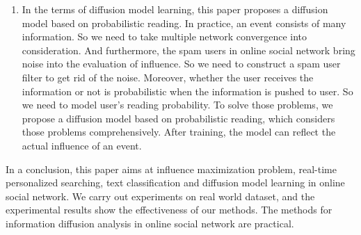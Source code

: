 \begin{eabstract}
\begin{enumerate}
	\item In the terms of diffusion model learning, this paper proposes a diffusion model based on probabilistic reading. In practice, an event consists of many information. So we need to take multiple network convergence into consideration. And furthermore, the spam users in online social network bring noise into the evaluation of influence. So we need to construct a spam user filter to get rid of the noise. Moreover, whether the user receives the information or not is probabilistic when the information is pushed to user. So we need to model user's reading probability. To solve those problems, we propose a diffusion model based on probabilistic reading, which considers those problems comprehensively. After training, the model can reflect the actual influence of an event.
\end{enumerate}

In a conclusion, this paper aims at influence maximization problem, real-time personalized searching, text classification and diffusion model learning in online social network. We carry out experiments on real world dataset, and the experimental results show the effectiveness of our methods. The methods for information diffusion analysis in online social network are practical.
\end{eabstract}

